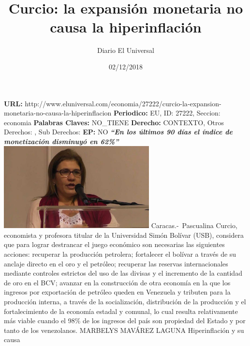 \documentclass{article}%
\title{\textbf{Curcio: la expansión monetaria no causa la hiperinflación}}%
\author{Diario El Universal}%
\date{02/12/2018}%
\begin{document}
%
\normalsize%
\maketitle%
\textbf{URL: }%
http://www.eluniversal.com/economia/27222/curcio{-}la{-}expansion{-}monetaria{-}no{-}causa{-}la{-}hiperinflacion\newline%
%
\textbf{Periodico: }%
EU, %
ID: %
27222, %
Seccion: %
economia\newline%
%
\textbf{Palabras Claves: }%
NO\_TIENE\newline%
%
\textbf{Derecho: }%
CONTEXTO, %
Otros Derechos: %
, %
Sub Derechos: %
\newline%
%
\textbf{EP: }%
NO\newline%
\newline%
%
\textbf{\textit{“En los últimos 90 días el índice de monetización disminuyó en 62\%”}}%
\newline%
\newline%
%
\includegraphics[width=300px]{67.jpg}%
\newline%
%
Caracas.{-}~Pascualina Curcio, economista y profesora titular de la Universidad Simón Bolívar (USB), considera  que para lograr destrancar el juego económico son necesarias las siguientes acciones: recuperar la producción petrolera; fortalecer el bolívar a través de su anclaje directo en el oro y el petróleo; recuperar las reservas internacionales mediante controles estrictos del uso de las divisas y el incremento de la cantidad de oro en el BCV; avanzar en la construcción de otra economía en la que los ingresos por exportación de petróleo queden en Venezuela y tributen para la producción interna, a través de la socialización, distribución de la producción y el fortalecimiento de la economía estadal y comunal, lo cual resulta relativamente más viable cuando el 98\% de los ingresos del país son propiedad del Estado y por tanto de los venezolanos.%
\newline%
%
MARBELYS MAVÁREZ LAGUNA%
\newline%
%
Hiperinflación y su causa%
\newline%
\end{document}
